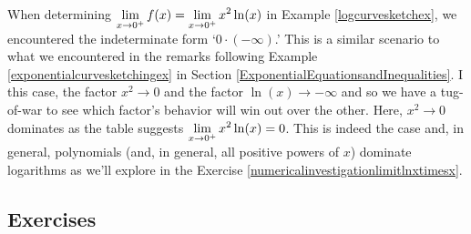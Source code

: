 \documentclass{ximera}
\begin{document}
When determining $\ds{\lim_{x \rightarrow 0^{+}} f(x)  = \lim_{x \rightarrow 0^{+}} x^2 \ln(x) }$ in Example \ref{logcurvesketchex}, we encountered the indeterminate form `$0 \cdot (-\infty)$.'  This is a similar scenario to what we encountered in the remarks following Example \ref{exponentialcurvesketchingex} in Section \ref{ExponentialEquationsandInequalities}.  I this case, the factor $x^2 \rightarrow 0$ and the factor $\ln(x) \rightarrow -\infty$ and so we have a tug-of-war to see which factor's behavior will win out over the other.  Here, $x^2 \rightarrow 0$ dominates as the table suggests $\ds{\lim_{x \rightarrow 0^{+}} x^2 \ln(x) = 0}$.  This is indeed the case and, in general, polynomials (and, in general, all positive powers of $x$) dominate logarithms as we'll explore in the Exercise \ref{numericalinvestigationlimitlnxtimesx}.  

\newpage

\subsection{Exercises}


\closegraphsfile
\end{document}
